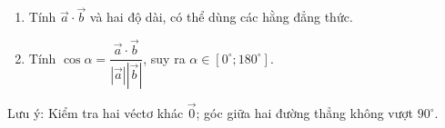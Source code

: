 \begin{enumerate}
\item Tính $\overrightarrow{a}\cdot\overrightarrow{b}$ và hai độ dài, có thể dùng các hằng đẳng thức.
\item Tính $\cos\alpha=\dfrac{\overrightarrow{a}\cdot\overrightarrow{b}}{|\overrightarrow{a}||\overrightarrow{b}|}$, suy ra $\alpha\in[0^\circ;180^\circ]$.
\end{enumerate}
Lưu ý: Kiểm tra hai véctơ khác $\overrightarrow{0}$; góc giữa hai đường thẳng không vượt $90^\circ$.
